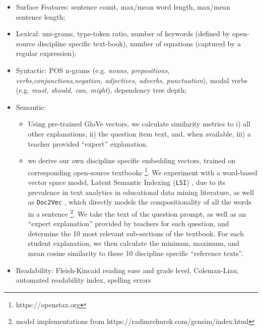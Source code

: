 \documentclass[notitlepage,12pt]{jedm}
\begin{document}
\begin{itemize}
	
	\item Surface Features: 
	sentence count, 
	max/mean word length, 
	max/mean sentence length;
	
	\item Lexical: 
	uni-grams, 
	type-token ratio, 
	number of keywords (defined by open-source discipline specific 
	text-book), 
	number of equations (captured by a regular expression);
	
	\item Syntactic: 
	POS n-grams (e.g. \textit{nouns, prepositions, 
		verbs,conjunctions,negation, adjectives, adverbs, punctuation}), 
	modal verbs (e.g. \textit{must, should, can, might}),
	dependency tree depth;
	
	\item Semantic:
	\begin{itemize}
		\item Using pre-trained GloVe \cite{pennington_glove:_2014} vectors, we 
		calculate similarity metrics to i) all other explanations, ii) the 
		question item text, and, when available, iii) a teacher provided 
		``expert'' explanation.
		\item we derive our own discipline specific embedding vectors, trained 
		on corresponding open-source textbooks \footnote{https://openstax.org}. 
		We experiment with a word-based vector space model, Latent Semantic 
		Indexing (\verb|LSI|) \cite{deerwester_indexing_1990}, due to its 
		prevalence in text analytics in educational data mining literature, as 
		well as \verb|Doc2Vec| \cite{le_distributed_2014}, which directly 
		models the compositionality of all the words in a sentence 
		\footnote{model implementations from 
		https://radimrehurek.com/gensim/index.html}.
		We take the text of the question prompt, as well as an ``expert 
		explanation'' provided by teachers for each question, and determine the 
		10 most relevant sub-sections of the textbook.
		For each student explanation, we then calculate the mininum, maximum, 
		and mean cosine similarity to these 10 discipline specific ``reference 
		texts''.
		 
	\end{itemize}
		
	
	\item Readability:
	Fleish-Kincaid reading ease and grade level,
	Coleman-Liau,
	automated readability index, 
	spelling errors
	
\end{itemize}
\end{document}
